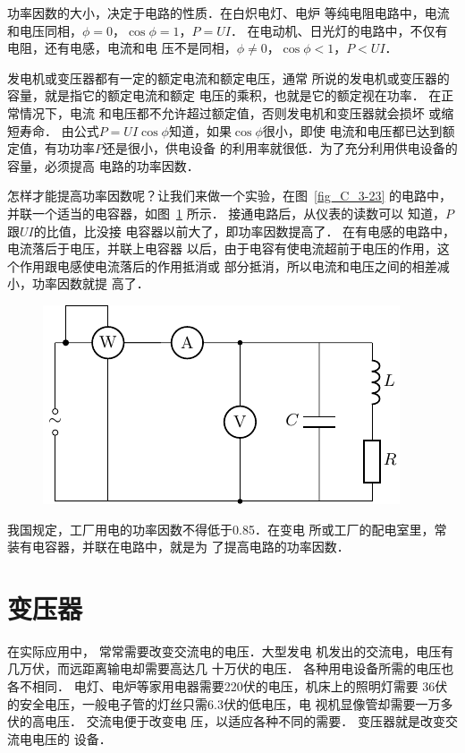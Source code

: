 功率因数的大小，决定于电路的性质．在白炽电灯、电炉
等纯电阻电路中，电流和电压同相，$\phi=0$，$\cos\phi=1$，$P=UI$．
在电动机、日光灯的电路中，不仅有电阻，还有电感，电流和电
压不是同相，$\phi\ne 0$，$\cos\phi<1$，$P<UI$．

发电机或变压器都有一定的额定电流和额定电压，通常
所说的发电机或变压器的容量，就是指它的额定电流和额定
电压的乘积，也就是它的额定视在功率．
在正常情况下，电流
和电压都不允许超过额定值，否则发电机和变压器就会损坏
或缩短寿命．
由公式$P=UI\cos\phi$知道，如果$\cos\phi$很小，即使
电流和电压都已达到额定值，有功功率$P$还是很小，供电设备
的利用率就很低．为了充分利用供电设备的容量，必须提高
电路的功率因数．



怎样才能提高功率因数呢？让我们来做一个实验，在图~\ref{fig_C_3-23} 的电路中，并联一个适当的电容器，如图~\ref{fig_C_3-24} 所示．
接通电路后，从仪表的读数可以
知道，$P$跟$UI$的比值，比没接
电容器以前大了，即功率因数提高了．
在有电感的电路中，电流落后于电压，并联上电容器
以后，由于电容有使电流超前于电压的作用，这个作用跟电感使电流落后的作用抵消或
部分抵消，所以电流和电压之间的相差减小，功率因数就提
高了．

\begin{figure}[htbp]
	\centering
	\includegraphics{fig/C/3-24.pdf}
	\caption{}\label{fig_C_3-24}
\end{figure}


我国规定，工厂用电的功率因数不得低于0.85．在变电
所或工厂的配电室里，常装有电容器，并联在电路中，就是为
了提高电路的功率因数．

\section{变压器}
在实际应用中，
常常需要改变交流电的电压．大型发电
机发出的交流电，电压有几万伏，而远距离输电却需要高达几
十万伏的电压．
各种用电设备所需的电压也各不相同．
电灯、电炉等家用电器需要220伏的电压，机床上的照明灯需要
36伏的安全电压，一般电子管的灯丝只需6.3伏的低电压，电
视机显像管却需要一万多伏的高电压．
交流电便于改变电
压，以适应各种不同的需要．
变压器就是改变交流电电压的
设备．

